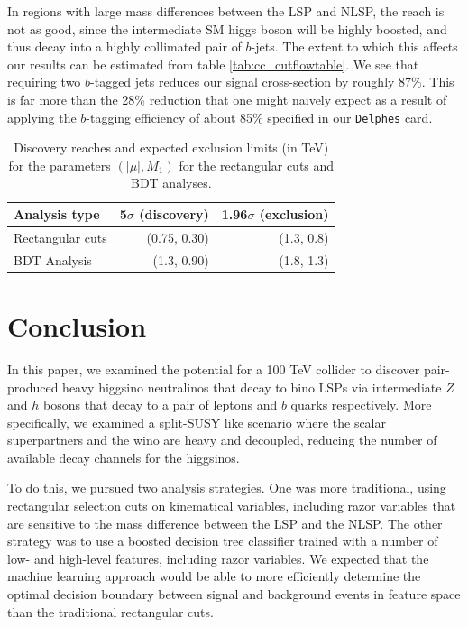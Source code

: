 In regions with large mass differences between the LSP and NLSP, the reach is not as good, since the intermediate SM higgs boson will be highly boosted, and thus decay into a highly collimated pair of $b$-jets. The extent to which this affects our results can be estimated from table \ref{tab:cc_cutflowtable}. We see that requiring two $b$-tagged jets reduces our signal cross-section by roughly 87\%. This is far more than the 28\% reduction that one might naively expect as a result of applying the $b$-tagging efficiency of about 85\% specified in our \texttt{Delphes} card. 

\begin{table}[h]
\centering
\begin{tabular}{l|rr}
\toprule
Analysis type & 5$\sigma$ (discovery)& 1.96$\sigma$ (exclusion)\\
\midrule
Rectangular cuts & (0.75, 0.30) & (1.3, 0.8)\\
BDT Analysis & (1.3, 0.90) & (1.8, 1.3)\\
\bottomrule
\end{tabular}
\caption{Discovery reaches and expected exclusion limits (in TeV) for the parameters $(|\mu|,M_1)$ for the rectangular cuts and BDT analyses.}
\label{tab:summary}
\end{table}

\section{Conclusion}\label{sec:conclusion}

In this paper, we examined the potential for a 100 TeV collider to discover pair-produced heavy higgsino neutralinos that decay to bino LSPs via intermediate $Z$ and $h$ bosons that decay to a pair of leptons and $b$ quarks respectively.  More specifically, we examined a split-SUSY like scenario where the scalar superpartners and the wino are heavy and decoupled, reducing the number of available decay channels for the higgsinos.

To do this, we pursued two analysis strategies. One was more traditional, using rectangular selection cuts on kinematical variables, including razor variables that are sensitive to the mass difference between the LSP and the NLSP. The other strategy was to use a boosted decision tree classifier trained with a number of low- and high-level features, including razor variables. We expected that the machine learning approach would be able to more efficiently determine the optimal decision boundary between signal and background events in feature space than the traditional rectangular cuts.

